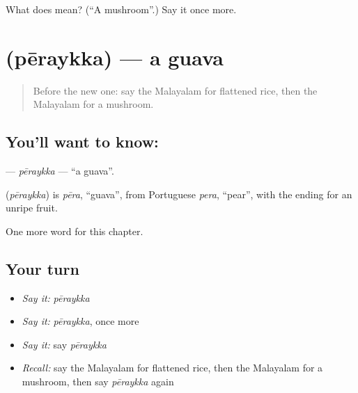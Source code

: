 \begin{tcolorbox}[breakable,colback=teal!4,colframe=teal!35!black,title={Before you move on}]
What does  mean? (\textquotedblleft{}A mushroom\textquotedblright{}.) Say it once more.
\end{tcolorbox}
\section[\texorpdfstring{\ml{പേരയ്ക്ക} (pēraykka)}{പേരയ്ക്ക (pēraykka)}]{ (pēraykka) — a guava}

\label{lesson:ML-C297-peraykka}



\begin{quote}
Before the new one: say the Malayalam for flattened rice, then the Malayalam for a mushroom.
\end{quote}

\subsection*{You'll want to know: }
\textbf{} — \emph{pēraykka} — \textquotedblleft{}a guava\textquotedblright{}.

\begin{cousinweb}
\textbf{} (\emph{pēraykka}) is \emph{pēra}, \textquotedblleft{}guava\textquotedblright{}, from Portuguese \emph{pera}, \textquotedblleft{}pear\textquotedblright{}, with the ending for an unripe fruit.
\end{cousinweb}

\begin{grammarlens}[title={What you've built}]
One more word for this chapter.
\end{grammarlens}

\subsection*{Your turn}
\begin{itemize}
\raggedright
  \item \emph{Say it:} \emph{pēraykka}
  \item \emph{Say it:} \emph{pēraykka}, once more
  \item \emph{Say it:} say \emph{pēraykka}
  \item \emph{Recall:} say the Malayalam for flattened rice, then the Malayalam for a mushroom, then say \emph{pēraykka} again
\end{itemize}

